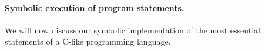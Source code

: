 {%



\paragraph{Symbolic execution of program statements.}
We will now discuss our symbolic implementation of the most essential statements
of a C-like programming language. 
%
%
%
%
%
%
}
